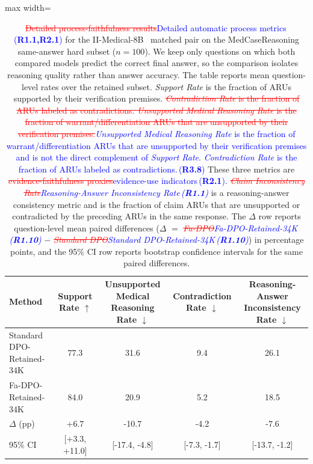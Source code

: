\documentclass[a4paper,fleqn,doubleblind]{cas-sc}
\DeclareRobustCommand{\deleted}[1]{\textcolor{red}{\sout{#1}}}
\DeclareRobustCommand{\added}[1]{\textcolor{blue}{#1}}
\DeclareRobustCommand{\revtag}[1]{\textcolor{blue}{\scriptsize\,(\textbf{#1})}}
\begin{document}
\begin{table}[htbp]
    \centering
    \footnotesize
    \setlength{\tabcolsep}{3.5pt}
    \caption[\deleted{Detailed process-faithfulness results}\added{Detailed automatic process metrics}\revtag{R1.1,R2.1} for the matched pair.]{\deleted{Detailed process-faithfulness results}\added{Detailed automatic process metrics}\revtag{R1.1,R2.1} for the II-Medical-8B~\cite{intelligentinternet2025iimedical8b} matched pair on the MedCaseReasoning same-answer hard subset ($n=100$). We keep only questions on which both compared models predict the correct final answer, so the comparison isolates reasoning quality rather than answer accuracy. The table reports mean question-level rates over the retained subset. \textit{Support Rate} is the fraction of ARUs supported by their verification premises. \deleted{\textit{Contradiction Rate} is the fraction of ARUs labeled as contradictions. \textit{Unsupported Medical Reasoning Rate} is the fraction of warrant/differentiation ARUs that are unsupported by their verification premises.}\added{\textit{Unsupported Medical Reasoning Rate} is the fraction of warrant/differentiation ARUs that are unsupported by their verification premises and is not the direct complement of \textit{Support Rate}. \textit{Contradiction Rate} is the fraction of ARUs labeled as contradictions.}\revtag{R3.8} These three metrics are \deleted{evidence-faithfulness proxies}\added{evidence-use indicators}\revtag{R2.1}. \textit{\deleted{Claim Inconsistency Rate}\added{Reasoning-Answer Inconsistency Rate}\revtag{R1.1}} is a reasoning-answer consistency metric and is the fraction of claim ARUs that are unsupported or contradicted by the preceding ARUs in the same response. The $\Delta$ row reports question-level mean paired differences ($\Delta$ $=$ \textit{\deleted{Fa-DPO}\added{Fa-DPO-Retained-34K}\revtag{R1.10}} $-$ \textit{\deleted{Standard DPO}\added{Standard DPO-Retained-34K}\revtag{R1.10}}) in percentage points, and the 95\% CI row reports bootstrap confidence intervals for the same paired differences.}
    \label{tab:iimedical_process_detail}
    \begin{adjustbox}{max width=\columnwidth}
    \begin{tabular}{lcccc}
        \toprule
        \textbf{Method} & \textbf{Support Rate $\uparrow$} & \textbf{Unsupported Medical Reasoning Rate $\downarrow$} & \textbf{Contradiction Rate $\downarrow$} & \textbf{Reasoning-Answer Inconsistency Rate $\downarrow$} \\
        \midrule
        Standard DPO-Retained-34K & 77.3 & 31.6 & 9.4 & 26.1 \\
        Fa-DPO-Retained-34K & 84.0 & 20.9 & 5.2 & 18.5 \\
        $\Delta$ (pp) & +6.7 & -10.7 & -4.2 & -7.6 \\
        95\% CI & [+3.3, +11.0] & [-17.4, -4.8] & [-7.3, -1.7] & [-13.7, -1.2] \\
        \bottomrule
    \end{tabular}
    \end{adjustbox}
\end{table}
\end{document}
